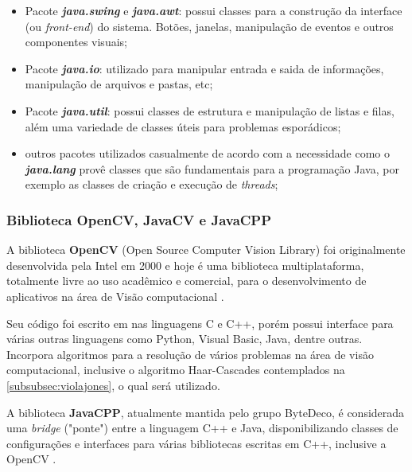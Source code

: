 \begin{itemize}
	
	\item Pacote \textbf{\textit{java.swing}} e \textbf{\textit{java.awt}}: possui classes para a construção da interface (ou \textit{front-end}) do sistema. Botões, janelas, manipulação de eventos e outros componentes visuais;
	
	\item Pacote \textbf{\textit{java.io}}: utilizado para manipular entrada e saida de informações, manipulação de arquivos e pastas, etc;
	
	\item Pacote \textbf{\textit{java.util}}: possui classes de estrutura e manipulação de listas e filas, além uma variedade de classes úteis para problemas esporádicos;
	
	\item outros pacotes utilizados casualmente de acordo com a necessidade como o \textbf{\textit{java.lang}} provê classes que são fundamentais para a programação Java, por exemplo as classes de criação e execução de \textit{threads};	
	
\end{itemize}

\subsubsection{Biblioteca OpenCV, JavaCV e JavaCPP}\label{subsec:bib_opencv}

A biblioteca \textbf{OpenCV} (Open Source Computer Vision Library) foi originalmente desenvolvida pela Intel em 2000 e hoje é uma biblioteca multiplataforma, totalmente livre ao uso acadêmico e comercial, para o desenvolvimento de aplicativos na área de Visão computacional \cite{opencv}.

Seu código foi escrito em nas linguagens C e C++, porém possui interface para várias outras linguagens como Python, Visual Basic, Java, dentre outras. Incorpora algoritmos para a resolução de vários problemas na área de visão computacional, inclusive o algoritmo Haar-Cascades contemplados na \autoref{subsubsec:violajones}, o qual será utilizado.

A biblioteca \textbf{JavaCPP}, atualmente mantida pelo grupo ByteDeco, é considerada uma \textit{bridge} ("ponte") entre a linguagem C++ e Java, disponibilizando classes de configurações e interfaces para várias bibliotecas escritas em C++, inclusive a OpenCV \cite{javacpp}.

